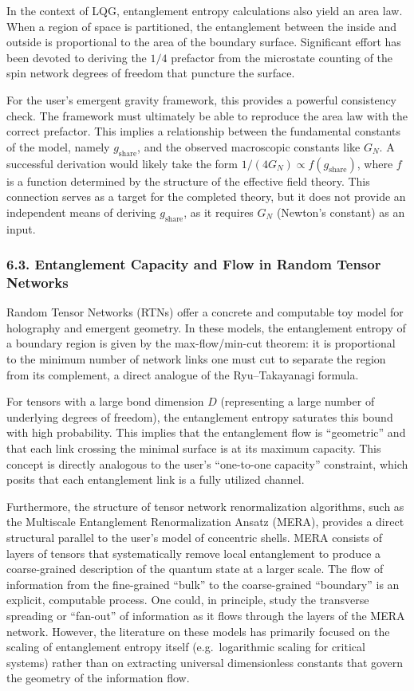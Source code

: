 \documentclass[11pt]{article}
\begin{document}
In the context of LQG, entanglement entropy calculations also yield an area law. When a region of space is partitioned, the entanglement between the inside and outside is proportional to the area of the boundary surface. Significant effort has been devoted to deriving the $1/4$ prefactor from the microstate counting of the spin network degrees of freedom that puncture the surface.

For the user’s emergent gravity framework, this provides a powerful consistency check. The framework must ultimately be able to reproduce the area law with the correct prefactor. This implies a relationship between the fundamental constants of the model, namely $g_{\mathrm{share}}$, and the observed macroscopic constants like $G_N$. A successful derivation would likely take the form $1/(4G_N) \propto f(g_{\mathrm{share}})$, where $f$ is a function determined by the structure of the effective field theory. This connection serves as a target for the completed theory, but it does not provide an independent means of deriving $g_{\mathrm{share}}$, as it requires $G_N$ (Newton’s constant) as an input.

\subsubsection*{6.3. Entanglement Capacity and Flow in Random Tensor Networks}
Random Tensor Networks (RTNs) offer a concrete and computable toy model for holography and emergent geometry. In these models, the entanglement entropy of a boundary region is given by the max-flow/min-cut theorem: it is proportional to the minimum number of network links one must cut to separate the region from its complement, a direct analogue of the Ryu–Takayanagi formula.

For tensors with a large bond dimension $D$ (representing a large number of underlying degrees of freedom), the entanglement entropy saturates this bound with high probability. This implies that the entanglement flow is “geometric” and that each link crossing the minimal surface is at its maximum capacity. This concept is directly analogous to the user’s “one-to-one capacity” constraint, which posits that each entanglement link is a fully utilized channel.

Furthermore, the structure of tensor network renormalization algorithms, such as the Multiscale Entanglement Renormalization Ansatz (MERA), provides a direct structural parallel to the user’s model of concentric shells. MERA consists of layers of tensors that systematically remove local entanglement to produce a coarse-grained description of the quantum state at a larger scale. The flow of information from the fine-grained “bulk” to the coarse-grained “boundary” is an explicit, computable process. One could, in principle, study the transverse spreading or “fan-out” of information as it flows through the layers of the MERA network. However, the literature on these models has primarily focused on the scaling of entanglement entropy itself (e.g.\ logarithmic scaling for critical systems) rather than on extracting universal dimensionless constants that govern the geometry of the information flow.
\end{document}
